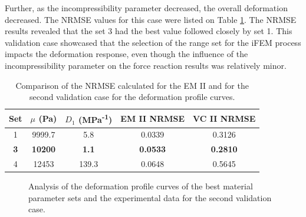 Further, as the incompressibility parameter decreased, the overall deformation decreased. The 
NRMSE values for this case were listed on Table \ref{tab:nrmsedefprof}. The NRMSE results 
revealed that the set \SI{3}{} had the best value followed closely by set \SI{1}{}. This validation case 
showcased that the selection of the range set for the iFEM process impacts the deformation response, even though the
influence of the incompressibility parameter on the force reaction results was relatively minor.\\
\begin{table}[ht!]
    \centering
    \begin{tabular}{|c|c|c|c|c|}
    \hline
    Set & $\mu$ (Pa) & $D_1$ (MPa\textsuperscript{-1}) & EM II NRMSE & VC II NRMSE\\
    \hline
    1 & 9999.7 & 5.8 & 0.0339 & 0.3126\\
    \textbf{3} & \textbf{10200} & \textbf{1.1} & \textbf{0.0533} & \textbf{0.2810}\\
    4 & 12453 & 139.3 & 0.0648 & 0.5645\\
    \hline
    \end{tabular}
    \caption[NRMSE for second validation case]{Comparison of the NRMSE calculated for the EM II and for the second validation case for the deformation profile curves.}
	\label{tab:nrmsedefprof}
\end{table}

\begin{figure}%
    \centering
   \quad
   \caption[Second validation case measurement data]{Analysis of the deformation profile curves of the best material parameter sets and the experimental data for the second validation case.}%
   \label{fig:defprofiledata}%
\end{figure}

